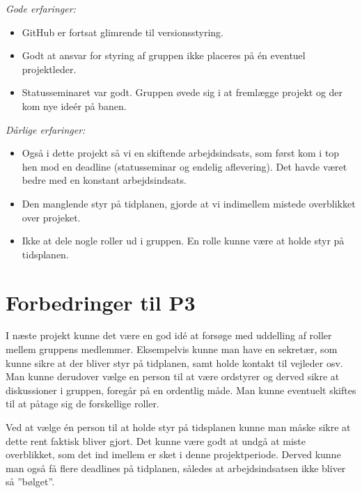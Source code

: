 \emph{Gode erfaringer:}
\begin {itemize}
\item  GitHub er fortsat glimrende til versionsstyring.

\item	Godt at ansvar for styring af gruppen ikke placeres på én eventuel projektleder. 

\item	Statusseminaret var godt. Gruppen øvede sig i at fremlægge projekt og der kom nye ideér på banen.
\end{itemize}\emph{Dårlige erfaringer:}
\begin{itemize}
\item	Også i dette projekt så vi en skiftende arbejdsindsats, som først kom i top hen mod en deadline (statusseminar og endelig aflevering). Det havde været bedre med en konstant arbejdsindsats. 

\item	Den manglende styr på tidplanen, gjorde at vi indimellem mistede overblikket over projeket. 

\item	Ikke at dele nogle roller ud i gruppen. En rolle kunne være at holde styr på tidsplanen.
\end{itemize}

\section{Forbedringer til P3}

I næste projekt kunne det være en god idé at forsøge med uddelling af roller mellem gruppens medlemmer. Eksempelvis kunne man have en sekretær, som kunne sikre at der bliver styr på tidplanen, samt holde kontakt til vejleder osv. Man kunne derudover vælge en person til at være ordstyrer og derved sikre at diskussioner i gruppen, foregår på en ordentlig måde. Man kunne eventuelt skiftes til at påtage sig de forskellige roller. 

Ved at vælge én person til at holde styr på tidsplanen kunne man måske sikre at dette rent faktisk bliver gjort. Det kunne være godt at undgå at miste overblikket, som det ind imellem er sket i denne projektperiode. Derved kunne man også få flere deadlines på tidplanen, således at arbejdsindsatsen ikke bliver så ”bølget”.

